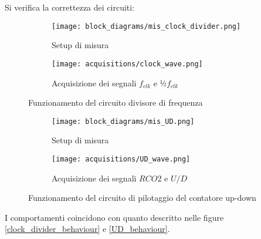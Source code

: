 Si verifica la correttezza dei circuiti:

\begin{figure}[H]
    \centering

    \begin{subfigure}{.5\textwidth}
        \centering
        \texttt{[image: block\_diagrams/mis\_clock\_divider.png]}
        \caption{Setup di misura}
        \label{mis_clock_divider}
    \end{subfigure}%
    \begin{subfigure}{.5\textwidth}
        \centering
        \texttt{[image: acquisitions/clock\_wave.png]}
        \caption{Acquisizione dei segnali $f_{clk}$ e ½$f_{clk}$}
        \label{acq_clock_divider}
    \end{subfigure}

    \caption{Funzionamento del circuito divisore di frequenza}
    \label{clock_divider}
\end{figure}

\begin{figure}[H]
    \centering

    \begin{subfigure}{.5\textwidth}
        \centering
        \texttt{[image: block\_diagrams/mis\_UD.png]}
        \caption{Setup di misura}
        \label{mis_UD}
    \end{subfigure}%
    \begin{subfigure}{.5\textwidth}
        \centering
        \texttt{[image: acquisitions/UD\_wave.png]}
        \caption{Acquisizione dei segnali $RCO2$ e $U/D$}
        \label{acq_UD}
    \end{subfigure}

    \caption{Funzionamento del circuito di pilotaggio del contatore up-down}
    \label{UD}
\end{figure}

I comportamenti coincidono con quanto descritto nelle figure \ref{clock_divider_behaviour} e
\ref{UD_behaviour}.

